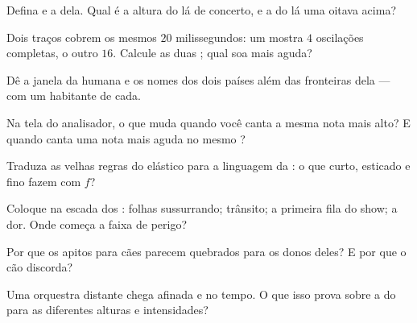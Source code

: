 \begin{exercise}[$\star$]\label{exo:g8:sound-pitch-loudness:1}
Defina  e a  dela. Qual é a altura do lá de concerto,
e a do lá uma oitava acima?
\end{exercise}

\begin{exercise}[$\star$]\label{exo:g8:sound-pitch-loudness:2}
Dois traços cobrem os mesmos $20$ milissegundos: um mostra $4$
oscilações completas, o outro $16$. Calcule as duas ; qual
soa mais aguda?
\end{exercise}

\begin{exercise}[$\star$]\label{exo:g8:sound-pitch-loudness:3}
Dê a janela da  humana e os nomes dos dois países além das
fronteiras dela --- com um habitante de cada.
\end{exercise}

\begin{exercise}[$\star$]\label{exo:g8:sound-pitch-loudness:4}
Na tela do analisador, o que muda quando você canta a mesma nota mais
alto? E quando canta uma nota mais aguda no mesmo ?
\end{exercise}

\begin{exercise}[$\star$]\label{exo:g8:sound-pitch-loudness:5}
Traduza as velhas regras do elástico para a linguagem da :
o que curto, esticado e fino fazem com $f$?
\end{exercise}

\begin{exercise}[$\star$]\label{exo:g8:sound-pitch-loudness:6}
Coloque na escada dos : folhas sussurrando; trânsito; a
primeira fila do show; a dor. Onde começa a faixa de perigo?
\end{exercise}

\begin{exercise}[$\star$]\label{exo:g8:sound-pitch-loudness:7}
Por que os apitos para cães parecem quebrados para os donos deles? E
por que o cão discorda?
\end{exercise}

\begin{exercise}[$\star$]\label{exo:g8:sound-pitch-loudness:8}
Uma orquestra distante chega afinada e no tempo. O que isso prova
sobre a  do  para as diferentes alturas e intensidades?
\end{exercise}

